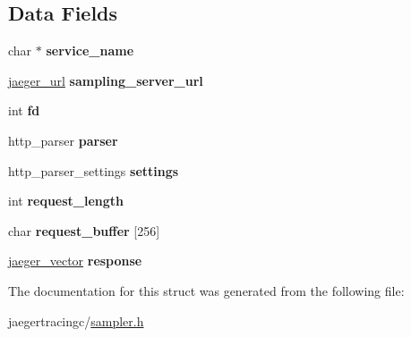 \subsection*{Data Fields}
\begin{DoxyCompactItemize}
\item 
\mbox{\label{structjaeger__http__sampling__manager_a3d951ac4fa00733acbbf594e46eed2ca}} 
char $\ast$ {\bfseries service\+\_\+name}
\item 
\mbox{\label{structjaeger__http__sampling__manager_a5c107ffae64e23dfc4e6d5d89ae8920e}} 
\mbox{\hyperlink{structjaeger__url}{jaeger\+\_\+url}} {\bfseries sampling\+\_\+server\+\_\+url}
\item 
\mbox{\label{structjaeger__http__sampling__manager_a5831094db16cbb7f08ee0733ce5861cf}} 
int {\bfseries fd}
\item 
\mbox{\label{structjaeger__http__sampling__manager_a0393fb1be95b7a6f9c42bd426855c96b}} 
http\+\_\+parser {\bfseries parser}
\item 
\mbox{\label{structjaeger__http__sampling__manager_aba8b8b9ad94bb73a1a613de8e6cbf9cd}} 
http\+\_\+parser\+\_\+settings {\bfseries settings}
\item 
\mbox{\label{structjaeger__http__sampling__manager_a199ab3b2a3f1e32295093771dfafa634}} 
int {\bfseries request\+\_\+length}
\item 
\mbox{\label{structjaeger__http__sampling__manager_a342eb6eab82e1383e540f246642c2872}} 
char {\bfseries request\+\_\+buffer} \mbox{[}256\mbox{]}
\item 
\mbox{\label{structjaeger__http__sampling__manager_a561df2066ae877b36bfd21e5caab2e38}} 
\mbox{\hyperlink{structjaeger__vector}{jaeger\+\_\+vector}} {\bfseries response}
\end{DoxyCompactItemize}


The documentation for this struct was generated from the following file\+:\begin{DoxyCompactItemize}
\item 
jaegertracingc/\mbox{\hyperlink{sampler_8h}{sampler.\+h}}\end{DoxyCompactItemize}
